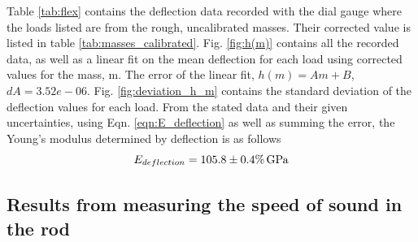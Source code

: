 \documentclass[11pt,a4paper]{article}
\begin{document}
  Table \ref{tab:flex} contains the deflection data recorded with the dial gauge where the loads listed are from the rough, uncalibrated masses. Their corrected value is listed in table \ref{tab:masses_calibrated}. 
  \newline
  \newline
  Fig. \ref{fig:h(m)} contains all the recorded data, as well as a linear fit on the mean deflection for each load using corrected values for the mass, m. The error of the linear fit, $h(m) = Am + B$, $dA = 3.52e-06$. Fig. \ref{fig:deviation_h_m} contains the standard deviation of the deflection values for each load.
  \newline
  \newline
  From the stated data and their given uncertainties, using Eqn. \ref{eqn:E_deflection} as well as summing the error, the Young's modulus determined by deflection is as follows
  \begin{equation}
    E_{deflection} = 105.8 \pm 0.4\% \, \textup{G}\textup{Pa}
  \end{equation}

  \subsection{Results from measuring the speed of sound in the rod}
\end{document}
